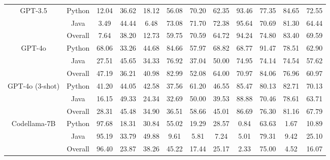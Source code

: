 \documentclass[11pt]{article}
\begin{document}
\begin{table}[h!]
\begin{tabular}{c  c ccc ccc ccc c}
\multirow{3}{*}{GPT-3.5}  & Python   & 12.04 & 36.62 & 18.12 & 56.08 & 70.20 & 62.35  & 93.46 & 77.35 & 84.65 & 72.55\\
 & Java   & 3.49 & 44.44 & 6.48 & 73.08 & 71.70 & 72.38  & 95.64 & 70.69 & 81.30 & 64.44\\
 & \cellcolor{gray!20}Overall  & \cellcolor{gray!20}7.64 & \cellcolor{gray!20}38.20 & \cellcolor{gray!20}12.73 & \cellcolor{gray!20}59.75 & \cellcolor{gray!20}70.59 & \cellcolor{gray!20}64.72  & \cellcolor{gray!20}94.24 & \cellcolor{gray!20}74.80 & \cellcolor{gray!20}83.40 & \cellcolor{gray!20}69.59\\

\midrule

\multirow{3}{*}{GPT-4o} & Python & 68.06 & 33.26 & 44.68 & 84.66 & 57.97 & 68.82 & 68.77 & 91.47 & 78.51 & 62.90 \\
 & Java  & 27.51 & 45.65 & 34.33 & 76.92 & 37.04 & 50.00   & 74.95 & 74.14 & 74.54 & 57.62\\
 & \cellcolor{gray!20}Overall  & \cellcolor{gray!20}47.19 & \cellcolor{gray!20}36.21 & \cellcolor{gray!20}40.98 & \cellcolor{gray!20}82.99 & \cellcolor{gray!20}52.08 & \cellcolor{gray!20}64.00   & \cellcolor{gray!20}70.97 & \cellcolor{gray!20}84.06 & \cellcolor{gray!20}76.96 & \cellcolor{gray!20}60.97\\

\midrule

\multirow{3}{*}{GPT-4o (3-shot)} & Python & 41.20 & 44.05 & 42.58 & 37.56 & 61.20 & 46.55 & 85.47 & 80.13 & 82.71 & 70.13 \\
 & Java  & 16.15 & 49.33 & 24.34 & 32.69 & 50.00 & 39.53   & 88.88 & 70.46 & 78.61 & 63.71\\
 & \cellcolor{gray!20}Overall  & \cellcolor{gray!20}28.31 & \cellcolor{gray!20}45.48 & \cellcolor{gray!20}34.90 & \cellcolor{gray!20}36.51 & \cellcolor{gray!20}58.66 & \cellcolor{gray!20}45.01   & \cellcolor{gray!20}86.69 & \cellcolor{gray!20}76.30 & \cellcolor{gray!20}81.16 & \cellcolor{gray!20}67.79\\

\midrule
\midrule

\multirow{3}{*}{Codellama-7B} &Python   & 97.68 & 18.31 & 30.84 & 55.02 & 19.29 & 28.57 & 0.84 & 63.63 & 1.67 & 10.89\\
 & Java   & 95.19 & 33.79 & 49.88 & 9.61 & 5.81 & 7.24 & 5.01 & 79.31 & 9.42 & 25.10\\
 & \cellcolor{gray!20}Overall & \cellcolor{gray!20}96.40 & \cellcolor{gray!20}23.87 & \cellcolor{gray!20}38.26 & \cellcolor{gray!20}45.22 & \cellcolor{gray!20}17.44 & \cellcolor{gray!20}25.17 &\cellcolor{gray!20}2.33 & \cellcolor{gray!20}75.00 & \cellcolor{gray!20}4.52  & \cellcolor{gray!20}16.07 \\


\end{tabular}
\end{table}
\end{document}
